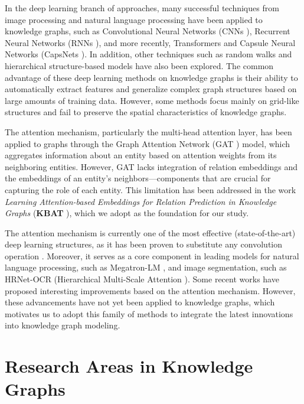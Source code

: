 In the deep learning branch of approaches, many successful techniques from image processing and natural language processing have been applied to knowledge graphs, such as Convolutional Neural Networks (CNNs \cite{lecun1999object}), Recurrent Neural Networks (RNNs \cite{hopfield2007hopfield}), and more recently, Transformers \cite{yang2019xlnet} and Capsule Neural Networks (CapsNets \cite{sabour2017dynamic}). In addition, other techniques such as random walks and hierarchical structure-based models have also been explored. The common advantage of these deep learning methods on knowledge graphs is their ability to automatically extract features and generalize complex graph structures based on large amounts of training data. However, some methods focus mainly on grid-like structures and fail to preserve the spatial characteristics of knowledge graphs.

The attention mechanism, particularly the multi-head attention layer, has been applied to graphs through the Graph Attention Network (GAT \cite{velivckovic2017graph}) model, which aggregates information about an entity based on attention weights from its neighboring entities. However, GAT lacks integration of relation embeddings and the embeddings of an entity's neighbors—components that are crucial for capturing the role of each entity. This limitation has been addressed in the work \textit{Learning Attention-based Embeddings for Relation Prediction in Knowledge Graphs} (\textbf{KBAT} \cite{nathani2019learning}), which we adopt as the foundation for our study.


The attention mechanism is currently one of the most effective (state-of-the-art) deep learning structures, as it has been proven to substitute any convolution operation \cite{cordonnier2019relationship}. Moreover, it serves as a core component in leading models for natural language processing, such as Megatron-LM \cite{shoeybi2019megatron}, and image segmentation, such as HRNet-OCR (Hierarchical Multi-Scale Attention \cite{tao2020hierarchical}). Some recent works \cite{cordonnier2020multi} have proposed interesting improvements based on the attention mechanism. However, these advancements have not yet been applied to knowledge graphs, which motivates us to adopt this family of methods to integrate the latest innovations into knowledge graph modeling.

\section{Research Areas in Knowledge Graphs}

